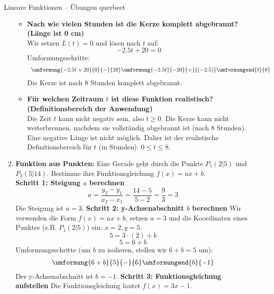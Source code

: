 \begin{loesungsumgebung}{Lineare Funktionen – Übungen querbeet}
\begin{enumerate}
\begin{itemize}
        \item \textbf{Nach wie vielen Stunden ist die Kerze komplett abgebrannt? (Länge ist 0 cm)} \\
        Wir setzen $L(t) = 0$ und lösen nach $t$ auf:
        $$ -2.5t + 20 = 0 $$
        Umformungsschritte:
        $$
        \begin{array}{r c l c l}
        \umformung{-2.5t + 20}{0}{-}{20}
        \umformung{-2.5t}{-20}{\div}{(-2.5)}
        \umformungend{t}{8}
        \end{array}
        $$
        Die Kerze ist nach 8 Stunden komplett abgebrannt.

        \item \textbf{Für welchen Zeitraum $t$ ist diese Funktion realistisch? (Definitionsbereich der Anwendung)} \\
        Die Zeit $t$ kann nicht negativ sein, also $t \ge 0$. Die Kerze kann nicht weiterbrennen, nachdem sie vollständig abgebrannt ist (nach 8 Stunden). Eine negative Länge ist nicht möglich.
        Daher ist der realistische Definitionsbereich für $t$ (in Stunden): $0 \le t \le 8$.
    \end{itemize}

    \item \textbf{Funktion aus Punkten:} Eine Gerade geht durch die Punkte $P_1(2|5)$ und $P_2(5|14)$. Bestimme ihre Funktionsgleichung $f(x)=ax+b$. \\
    \textbf{Schritt 1: Steigung $a$ berechnen}
    $$ a = \frac{y_2 - y_1}{x_2 - x_1} = \frac{14 - 5}{5 - 2} = \frac{9}{3} = 3 $$
    Die Steigung ist $a=3$.
    \textbf{Schritt 2: y-Achsenabschnitt $b$ berechnen}
    Wir verwenden die Form $f(x) = ax+b$, setzen $a=3$ und die Koordinaten eines Punktes (z.B. $P_1(2|5)$) ein: $x=2, y=5$.
    $$ 5 = 3 \cdot (2) + b $$
    $$ 5 = 6 + b $$
    Umformungsschritte (um $b$ zu isolieren, stellen wir $6+b=5$ um):
    $$
    \begin{array}{r c l c l}
    \umformung{6+b}{5}{-}{6}
    \umformungend{b}{-1}
    \end{array}
    $$
    Der y-Achsenabschnitt ist $b=-1$.
    \textbf{Schritt 3: Funktionsgleichung aufstellen}
    Die Funktionsgleichung lautet $f(x) = 3x - 1$.


\end{enumerate}
\end{loesungsumgebung}
